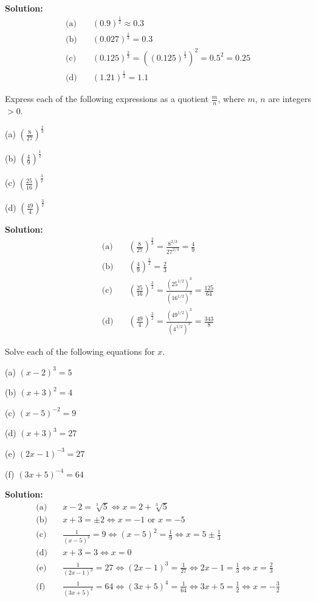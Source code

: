 \textbf{Solution:}
\begin{align*}
\text{(a)}\quad & (0.9)^{\frac{1}{2}} \approx 0.3 \\
\text{(b)}\quad & (0.027)^{\frac{1}{3}} = 0.3 \\
\text{(c)}\quad & (0.125)^{\frac{2}{3}} = ((0.125)^{\frac{1}{3}})^2 = 0.5^2 = 0.25 \\
\text{(d)}\quad & (1.21)^{\frac{1}{2}} = 1.1
\end{align*}

\begin{tcolorbox}[title=Problem 8, breakable]
    Express each of the following expressions as a quotient $\frac{m}{n}$, where $m$,
    $n$ are integers $> 0$.

    (a) $\left(\frac{8}{27}\right)^{\frac{2}{3}}$

    (b) $\left(\frac{4}{9}\right)^{\frac{1}{2}}$

    (c) $\left(\frac{25}{16}\right)^{\frac{3}{2}}$

    (d) $\left(\frac{49}{4}\right)^{\frac{3}{2}}$
\end{tcolorbox}

\textbf{Solution:}
\begin{align*}
\text{(a)}\quad & \left(\frac{8}{27}\right)^{\frac{2}{3}} = \frac{8^{2/3}}{27^{2/3}} = \frac{4}{9} \\
\text{(b)}\quad & \left(\frac{4}{9}\right)^{\frac{1}{2}} = \frac{2}{3} \\
\text{(c)}\quad & \left(\frac{25}{16}\right)^{\frac{3}{2}} = \frac{(25^{1/2})^3}{(16^{1/2})^3} = \frac{125}{64} \\
\text{(d)}\quad & \left(\frac{49}{4}\right)^{\frac{3}{2}} = \frac{(49^{1/2})^3}{(4^{1/2})^3} = \frac{343}{8}
\end{align*}

\begin{tcolorbox}[title=Problem 9, breakable]
    Solve each of the following equations for $x$.

    (a) $(x - 2)^{3} = 5$

    (b) $(x + 3)^{2} = 4$

    (c) $(x - 5)^{-2} = 9$

    (d) $(x + 3)^{3} = 27$

    (e) $(2x - 1)^{-3} = 27$

    (f) $(3x + 5)^{-4} = 64$
\end{tcolorbox}

\textbf{Solution:}
\begin{align*}
\text{(a)}\quad & x - 2 = \sqrt[3]{5} \iff x = 2 + \sqrt[3]{5} \\
\text{(b)}\quad & x + 3 = \pm 2 \iff x = -1 \text{ or } x = -5 \\
\text{(c)}\quad & \frac{1}{(x-5)^2} = 9 \iff (x-5)^2 = \frac{1}{9} \iff x = 5 \pm \frac{1}{3} \\
\text{(d)}\quad & x + 3 = 3 \iff x = 0 \\
\text{(e)}\quad & \frac{1}{(2x-1)^3} = 27 \iff (2x-1)^3 = \frac{1}{27} \iff 2x-1 = \frac{1}{3} \iff x = \frac{2}{3} \\
\text{(f)}\quad & \frac{1}{(3x+5)^4} = 64 \iff (3x+5)^4 = \frac{1}{64} \iff 3x+5 = \frac{1}{2} \iff x = -\frac{3}{2}
\end{align*}

